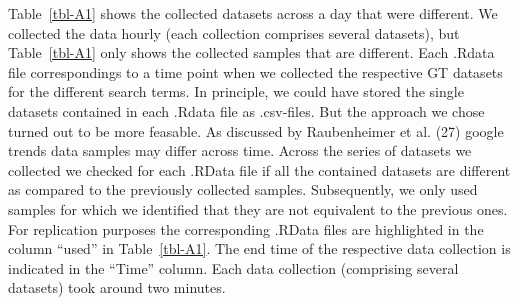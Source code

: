 \documentclass[
  letterpaper,
  DIV=11,
  numbers=noendperiod]{scrartcl}
\begin{document}
Table~\ref{tbl-A1} shows the collected datasets across a day that were
different. We collected the data hourly (each collection comprises
several datasets), but Table~\ref{tbl-A1} only shows the collected
samples that are different. Each .Rdata file correspondings to a time
point when we collected the respective GT datasets for the different
search terms. In principle, we could have stored the single datasets
contained in each .Rdata file as .csv-files. But the approach we chose
turned out to be more feasable. As discussed by Raubenheimer et al. (27)
google trends data samples may differ across time. Across the series of
datasets we collected we checked for each .RData file if all the
contained datasets are different as compared to the previously collected
samples. Subsequently, we only used samples for which we identified that
they are not equivalent to the previous ones. For replication purposes
the corresponding .RData files are highlighted in the column ``used'' in
Table~\ref{tbl-A1}. The end time of the respective data collection is
indicated in the ``Time'' column. Each data collection (comprising
several datasets) took around two minutes.
\end{document}
